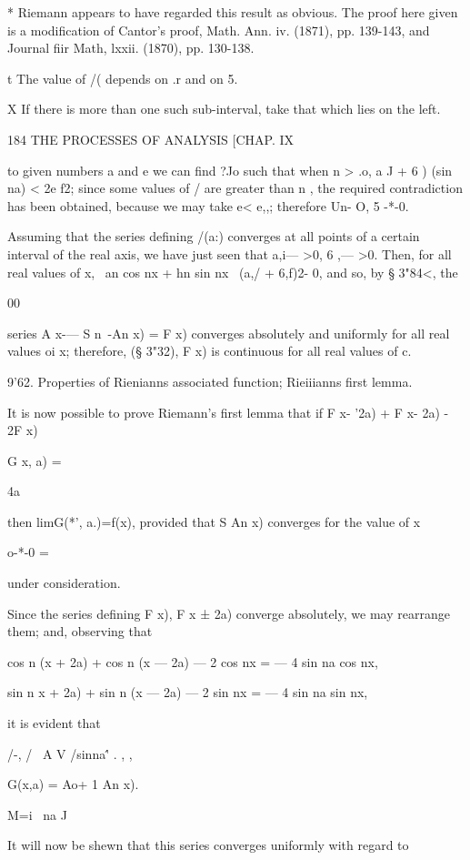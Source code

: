 * Riemann appears to have regarded this result as obvious. The proof
here given is a modification of Cantor's proof, Math. Ann. iv. (1871),
pp. 139-143, and Journal fiir Math, lxxii. (1870), pp. 130-138.

t The value of /( depends on .r and on 5.

X If there is more than one such sub-interval, take that which lies on
the left.

184 THE PROCESSES OF ANALYSIS [CHAP. IX

to given numbers a and e we can find ?Jo such that when n > .o, a J +
6 ) (sin na) < 2e f2; since some values of / are greater than n , the
required contradiction has been obtained, because we may take e< e,,;
therefore Un- O, 5 -*-0.

Assuming that the series defining /(a:) converges at all points of a
certain interval of the real axis, we have just seen that a,i— >0, 6
,— >0. Then, for all real values of x, \ an cos nx + hn sin nx \ (a,/
+ 6,f)2- 0, and so, by § 3"84<, the

00

series A x-— S n~-An x) = F x) converges absolutely and uniformly for
all real values oi x; therefore, (§ 3"32), F x) is continuous for all
real values of c.

9'62. Properties of Rienianns associated function; Rieiiianns first
lemma.

It is now possible to prove Riemann's first lemma that if F x- '2a) +
F x- 2a) - 2F x)

G x, a) =

4a

then limG(*', a.)=f(x), provided that S An x) converges for the value
of x

o-*-0 =

under consideration.

Since the series defining F x), F x ± 2a) converge absolutely, we may
rearrange them; and, observing that

cos n (x + 2a) + cos n (x — 2a) — 2 cos nx = — 4 sin na cos nx,

sin n x + 2a) + sin n (x — 2a) — 2 sin nx = — 4 sin na sin nx,

it is evident that

/-, / \ A V /sinna\'' . , ,

G(x,a) = Ao+ 1 An x).

M=i \ na J

It will now be shewn that this series converges uniformly with regard
to

